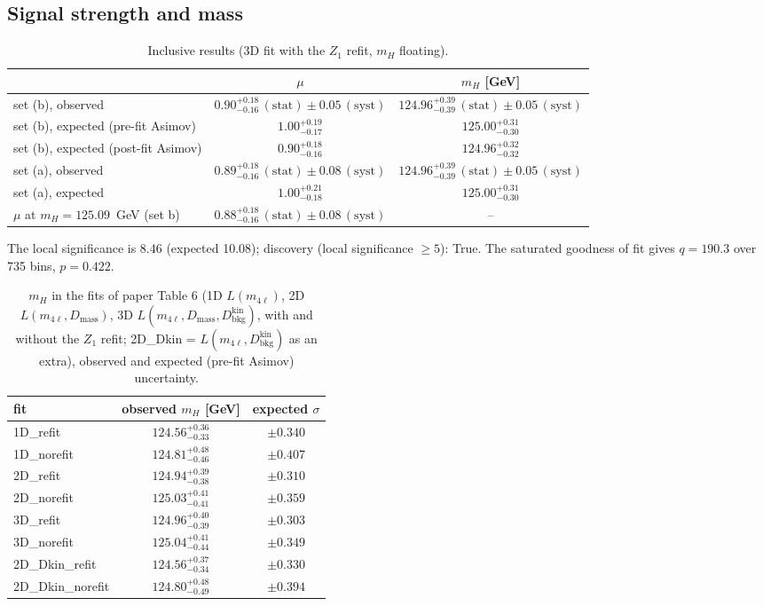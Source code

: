 \documentclass[11pt,a4paper]{article}
\begin{document}
\subsection{Signal strength and mass}
\begin{table}[H]\centering\small\caption{Inclusive results (3D fit with the $Z_1$ refit, $m_H$ floating).}\begin{tabular}{lcc}\toprule & $\mu$ & $m_H$ [GeV]\\\midrule
set (b), observed & $0.90^{+0.18}_{-0.16}\,(\text{stat})\pm0.05\,(\text{syst})$ & $124.96^{+0.39}_{-0.39}\,(\text{stat})\pm0.05\,(\text{syst})$\\
set (b), expected (pre-fit Asimov) & $1.00^{+0.19}_{-0.17}$ & $125.00^{+0.31}_{-0.30}$\\
set (b), expected (post-fit Asimov) & $0.90^{+0.18}_{-0.16}$ & $124.96^{+0.32}_{-0.32}$\\
set (a), observed & $0.89^{+0.18}_{-0.16}\,(\text{stat})\pm0.08\,(\text{syst})$ & $124.96^{+0.39}_{-0.39}\,(\text{stat})\pm0.05\,(\text{syst})$\\
set (a), expected & $1.00^{+0.21}_{-0.18}$ & $125.00^{+0.31}_{-0.30}$\\
$\mu$ at $m_H=125.09$~GeV (set b) & $0.88^{+0.18}_{-0.16}\,(\text{stat})\pm0.08\,(\text{syst})$ & --\\
\bottomrule\end{tabular}\end{table}
The local significance is 8.46 (expected 10.08); discovery (local significance $\geq5$): True.  The saturated goodness of fit gives $q=190.3$ over 735 bins, $p=0.422$.
\begin{table}[H]\centering\small\caption{$m_H$ in the fits of paper Table 6 (1D $L(m_{4\ell})$, 2D $L(m_{4\ell},D_{\text{mass}})$, 3D $L(m_{4\ell},D_{\text{mass}},D_{\text{bkg}}^{\text{kin}})$, with and without the $Z_1$ refit; 2D\_Dkin = $L(m_{4\ell},D_{\text{bkg}}^{\text{kin}})$ as an extra), observed and expected (pre-fit Asimov) uncertainty.}\begin{tabular}{lcc}\toprule fit & observed $m_H$ [GeV] & expected $\sigma$\\\midrule
1D\_refit & $124.56^{+0.36}_{-0.33}$ & $\pm0.340$\\
1D\_norefit & $124.81^{+0.48}_{-0.46}$ & $\pm0.407$\\
2D\_refit & $124.94^{+0.39}_{-0.38}$ & $\pm0.310$\\
2D\_norefit & $125.03^{+0.41}_{-0.41}$ & $\pm0.359$\\
3D\_refit & $124.96^{+0.40}_{-0.39}$ & $\pm0.303$\\
3D\_norefit & $125.04^{+0.41}_{-0.44}$ & $\pm0.349$\\
2D\_Dkin\_refit & $124.56^{+0.37}_{-0.34}$ & $\pm0.330$\\
2D\_Dkin\_norefit & $124.80^{+0.48}_{-0.49}$ & $\pm0.394$\\
\bottomrule\end{tabular}\end{table}
\end{document}
